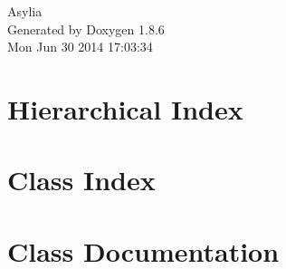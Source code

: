 \documentclass[twoside]{book}
\newcommand{\clearemptydoublepage}{%
  \newpage{\pagestyle{empty}\cleardoublepage}%
}
\begin{document}
\hypersetup{pageanchor=false}
\begin{titlepage}
\vspace*{7cm}
\begin{center}%
{\Large Asylia }\\
\vspace*{1cm}
{\large Generated by Doxygen 1.8.6}\\
\vspace*{0.5cm}
{\small Mon Jun 30 2014 17:03:34}\\
\end{center}
\end{titlepage}
\clearemptydoublepage
\tableofcontents
\clearemptydoublepage
{}
\hypersetup{pageanchor=true}

\chapter{Hierarchical Index}

\chapter{Class Index}

\chapter{Class Documentation}






































































\newpage
{}
{}
\printindex
\end{document}
